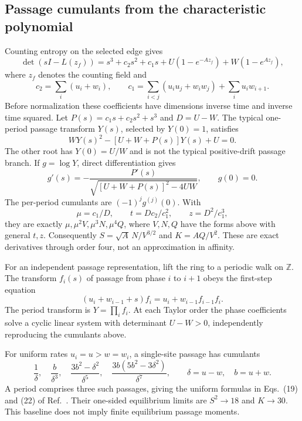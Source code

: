 \documentclass[11pt,a4paper]{article}
\begin{document}
\subsection{Passage cumulants from the characteristic polynomial}
Counting entropy on the selected edge gives
\begin{equation}\label{eq:det}
 \det(sI-L(z_f))=s^3+c_2s^2+c_1s+U(1-e^{-Az_f})+W(1-e^{Az_f}),
\end{equation}
where $z_f$ denotes the counting field and
\begin{equation}
 c_2=\sum_i(u_i+w_i),\qquad
 c_1=\sum_{i<j}(u_iu_j+w_iw_j)+\sum_i u_iw_{i+1}.
\end{equation}
Before normalization these coefficients have dimensions inverse time and inverse time squared. Let $P(s)=c_1s+c_2s^2+s^3$ and $D=U-W$. The typical one-period passage transform $Y(s)$, selected by $Y(0)=1$, satisfies
\begin{equation}\label{eq:Y}
 WY(s)^2-[U+W+P(s)]Y(s)+U=0.
\end{equation}
The other root has $Y(0)=U/W$ and is not the typical positive-drift passage branch. If $g=\log Y$, direct differentiation gives
\begin{equation}
 g'(s)=-\frac{P'(s)}{\sqrt{[U+W+P(s)]^2-4UW}},\qquad g(0)=0.
\end{equation}
The per-period cumulants are $(-1)^j g^{(j)}(0)$. With
\begin{equation}
 \mu=c_1/D,\qquad t=Dc_2/c_1^2,\qquad z=D^2/c_1^3,
\end{equation}
they are exactly $\mu,\mu^2V,\mu^3N,\mu^4Q$, where $V,N,Q$ have the forms above with general $t,z$. Consequently $S=\sqrt A\,N/V^{3/2}$ and $K=AQ/V^2$. These are exact derivatives through order four, not an approximation in affinity.

For an independent passage representation, lift the ring to a periodic walk on $\mathbb Z$. The transform $f_i(s)$ of passage from phase $i$ to $i+1$ obeys the first-step equation
\begin{equation}\label{eq:renewal}
 (u_i+w_{i-1}+s)f_i=u_i+w_{i-1}f_{i-1}f_i.
\end{equation}
The period transform is $Y=\prod_i f_i$. At each Taylor order the phase coefficients solve a cyclic linear system with determinant $U-W>0$, independently reproducing the cumulants above.

For uniform rates $u_i=u>w=w_i$, a single-site passage has cumulants
\begin{equation}
 \frac1\delta,\quad\frac{b}{\delta^3},\quad\frac{3b^2-\delta^2}{\delta^5},\quad
 \frac{3b(5b^2-3\delta^2)}{\delta^7},\qquad \delta=u-w,\quad b=u+w.
\end{equation}
A period comprises three such passages, giving the uniform formulas in Eqs.~(19) and (22) of Ref.~\cite{Wampler2021}. Their one-sided equilibrium limits are $S^2\to18$ and $K\to30$. This baseline does not imply finite equilibrium passage moments.
\end{document}
